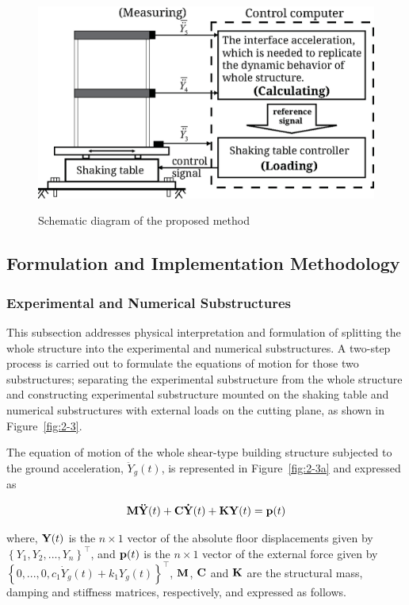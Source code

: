 \begin{figure}[ht]
\centering
\includegraphics[scale =1] {figure/2-2.eps}
\label{fig:2-2}
\caption{Schematic diagram of the proposed method}
\end{figure}

\subsection{Formulation and Implementation Methodology}
\subsubsection{Experimental and Numerical Substructures}\label{2-2-1}
This subsection addresses physical interpretation and formulation of splitting the whole structure into the experimental and numerical substructures. A two-step process is carried out to formulate the equations of motion for those two substructures; separating the experimental substructure from the whole structure and constructing experimental substructure mounted on the shaking table and numerical substructures with external loads on the cutting plane, as shown in Figure~\ref{fig:2-3}. 

The equation of motion of the whole shear-type building structure subjected to the ground acceleration, $\ddot{Y}_g (t)$, is represented in Figure~\ref{fig:2-3a} and expressed as

\begin{equation}\label{eq:2-1}
\mathbf{M}\mathbf{\ddot{Y}}(t)+\mathbf{C}\mathbf{\dot{Y}}(t)+\mathbf{K}\mathbf{Y}(t) = \mathbf{p}(t)
\end{equation}

where, $\mathbf{Y}(t)$ is the $n \times 1$ vector of the absolute floor displacements given by $\left\{Y_{1},Y_{2},...,Y_{n}\right\}^{\top}$, and $\mathbf{p}(t)$ is the $n \times 1$ vector of the external force given by $\left\{0,...,0,c_{1}\dot{Y}_{g}(t)+k_{1}Y_{g}(t)\right\}^{\top}$, $\mathbf{M}$, $\mathbf{C}$ and $\mathbf{K}$ are the structural mass, damping and stiffness matrices, respectively, and expressed as follows.

